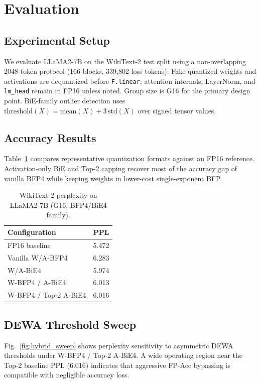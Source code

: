 \section{Evaluation}
\label{sec:evaluation}

\subsection{Experimental Setup}
We evaluate LLaMA2-7B on the WikiText-2 test split using a non-overlapping 2048-token protocol (166 blocks, 339{,}802 loss tokens).
Fake-quantized weights and activations are dequantized before \texttt{F.linear}; attention internals, LayerNorm, and \texttt{lm\_head} remain in FP16 unless noted.
Group size is G16 for the primary design point.
BiE-family outlier detection uses $\mathrm{threshold}(X) = \mathrm{mean}(X) + 3\,\mathrm{std}(X)$ over signed tensor values.

\subsection{Accuracy Results}
Table~\ref{tab:ppl} compares representative quantization formats against an FP16 reference.
Activation-only BiE and Top-2 capping recover most of the accuracy gap of vanilla BFP4 while keeping weights in lower-cost single-exponent BFP.

\begin{table}[t]
    \centering
    \caption{WikiText-2 perplexity on LLaMA2-7B (G16, BFP4/BiE4 family).}
    \label{tab:ppl}
    \begin{tabular}{lc}
        \toprule
        Configuration & PPL \\
        \midrule
        FP16 baseline & 5.472 \\
        Vanilla W/A-BFP4 & 6.283 \\
        W/A-BiE4 & 5.974 \\
        W-BFP4 / A-BiE4 & 6.013 \\
        W-BFP4 / Top-2 A-BiE4 & 6.016 \\
        \bottomrule
    \end{tabular}
\end{table}

\subsection{DEWA Threshold Sweep}
Fig.~\ref{fig:hybrid_sweep} shows perplexity sensitivity to asymmetric DEWA thresholds under W-BFP4 / Top-2 A-BiE4.
A wide operating region near the Top-2 baseline PPL (6.016) indicates that aggressive FP-Acc bypassing is compatible with negligible accuracy loss.

